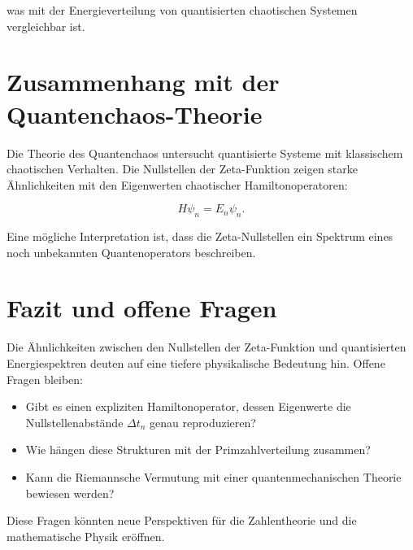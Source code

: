 \documentclass[a4paper,12pt]{article}
\begin{document}
was mit der Energieverteilung von quantisierten chaotischen Systemen vergleichbar ist.

\section{Zusammenhang mit der Quantenchaos-Theorie}
Die Theorie des Quantenchaos untersucht quantisierte Systeme mit klassischem chaotischen Verhalten. Die Nullstellen der Zeta-Funktion zeigen starke Ähnlichkeiten mit den Eigenwerten chaotischer Hamiltonoperatoren:

\begin{equation}
H \psi_n = E_n \psi_n.
\end{equation}

Eine mögliche Interpretation ist, dass die Zeta-Nullstellen ein Spektrum eines noch unbekannten Quantenoperators beschreiben.

\section{Fazit und offene Fragen}
Die Ähnlichkeiten zwischen den Nullstellen der Zeta-Funktion und quantisierten Energiespektren deuten auf eine tiefere physikalische Bedeutung hin. Offene Fragen bleiben:

\begin{itemize}
    \item Gibt es einen expliziten Hamiltonoperator, dessen Eigenwerte die Nullstellenabstände \( \Delta t_n \) genau reproduzieren?
    \item Wie hängen diese Strukturen mit der Primzahlverteilung zusammen?
    \item Kann die Riemannsche Vermutung mit einer quantenmechanischen Theorie bewiesen werden?
\end{itemize}

Diese Fragen könnten neue Perspektiven für die Zahlentheorie und die mathematische Physik eröffnen.
\end{document}
